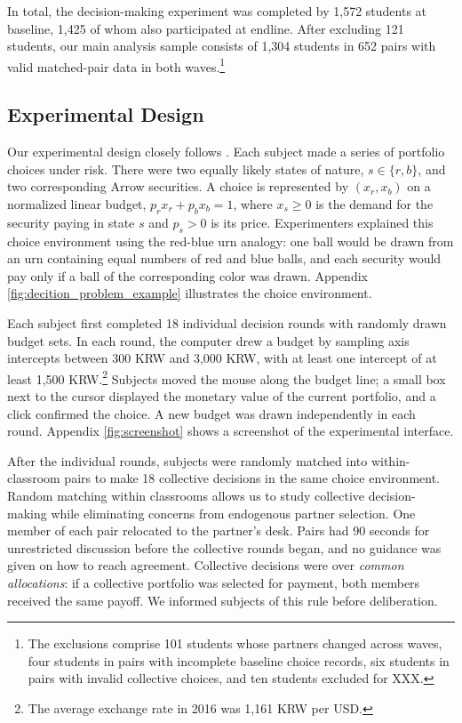 \documentclass[11 pt]{article}
\begin{document}
In total, the decision-making experiment was completed by 1,572 students at baseline, 1,425 of whom also participated at endline. After excluding 121 students, our main analysis sample consists of 1,304 students in 652 pairs with valid matched-pair data in both waves.\footnote{The exclusions comprise 101 students whose partners changed across waves, four students in pairs with incomplete baseline choice records, six students in pairs with invalid collective choices, and ten students excluded for XXX.}



\subsection{Experimental Design}
\label{subsec:design}

Our experimental design closely follows \citet{Choietal:2007:AER}. Each subject made a series of portfolio choices under risk. There were two equally likely states of nature, $s \in \{r, b\}$, and two corresponding Arrow securities. A choice is represented by $(x_r, x_b)$ on a normalized linear budget, $p_r x_r + p_b x_b = 1$, where $x_s \geq 0$ is the demand for the security paying in state $s$ and $p_s > 0$ is its price. Experimenters explained this choice environment using the red-blue urn analogy: one ball would be drawn from an urn containing equal numbers of red and blue balls, and each security would pay only if a ball of the corresponding color was drawn. Appendix \autoref{fig:decition_problem_example} illustrates the choice environment.

Each subject first completed 18 individual decision rounds with randomly drawn budget sets. In each round, the computer drew a budget by sampling axis intercepts between 300 KRW and 3,000 KRW, with at least one intercept of at least 1,500 KRW.\footnote{The average exchange rate in 2016 was 1,161 KRW per USD.} Subjects moved the mouse along the budget line; a small box next to the cursor displayed the monetary value of the current portfolio, and a click confirmed the choice. A new budget was drawn independently in each round. Appendix \autoref{fig:screenshot} shows a screenshot of the experimental interface.

After the individual rounds, subjects were randomly matched into within-classroom pairs to make 18 collective decisions in the same choice environment. Random matching within classrooms allows us to study collective decision-making while eliminating concerns from endogenous partner selection. One member of each pair relocated to the partner's desk. Pairs had 90 seconds for unrestricted discussion before the collective rounds began, and no guidance was given on how to reach agreement. Collective decisions were over \textit{common allocations}: if a collective portfolio was selected for payment, both members received the same payoff. We informed subjects of this rule before deliberation.
\end{document}
